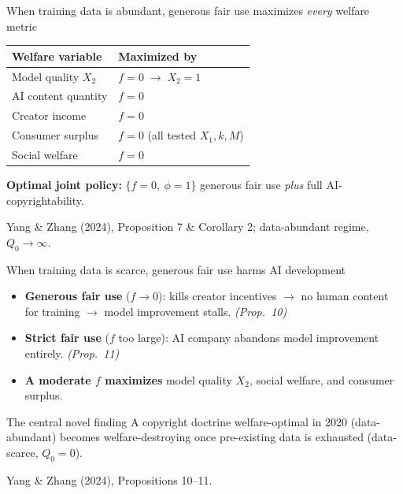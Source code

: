 \documentclass[aspectratio=169,11pt]{beamer}
\begin{document}
\begin{frame}{When training data is abundant, generous fair use maximizes \emph{every} welfare metric}
\begin{center}
\renewcommand{\arraystretch}{1.2}
\begin{tabular}{@{}p{5.6cm}p{5.6cm}@{}}
\toprule
\textbf{Welfare variable} & \textbf{Maximized by} \\
\midrule
Model quality $X_2$ & $f = 0 \;\rightarrow\; X_2 = 1$ \\
AI content quantity & $f = 0$ \\
Creator income & $f = 0$ \\
Consumer surplus & $f = 0$ (all tested $X_1, k, M$) \\
Social welfare & $f = 0$ \\
\bottomrule
\end{tabular}
\end{center}
\vspace{0.2cm}
\textbf{Optimal joint policy:} $\{f=0,\ \phi=1\}$ \textemdash{} generous fair use \emph{plus} full AI-copyrightability.\\[0.2cm]
\begin{flushright}
\footnotesize\textcolor{WarmGray}{Yang \& Zhang (2024), Proposition 7 \& Corollary 2; data-abundant regime, $Q_0 \to \infty$.}
\end{flushright}
\end{frame}

\begin{frame}{When training data is scarce, generous fair use \alert{harms} AI development}
\vspace{0.3cm}
\begin{itemize}
\item \textbf{Generous fair use} ($f \to 0$): kills creator incentives $\rightarrow$ \alert{no human content} for training $\rightarrow$ model improvement stalls. \emph{(Prop.~10)}
\item \textbf{Strict fair use} ($f$ too large): AI company \alert{abandons model improvement} entirely. \emph{(Prop.~11)}
\item \textbf{A moderate $f$ maximizes} model quality $X_2$, social welfare, and consumer surplus.
\end{itemize}
\vspace{0.5cm}
\begin{block}{The central novel finding}
A copyright doctrine welfare-optimal in 2020 (data-abundant) becomes welfare-destroying once pre-existing data is exhausted (data-scarce, $Q_0 = 0$).
\end{block}
\vspace{0.2cm}
\begin{flushright}
\footnotesize\textcolor{WarmGray}{Yang \& Zhang (2024), Propositions 10--11.}
\end{flushright}
\end{frame}
\end{document}
